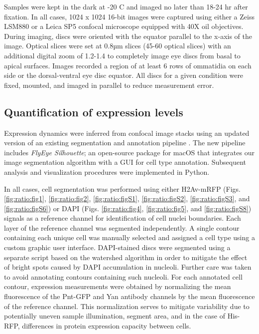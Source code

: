 Samples were kept in the dark at -20 \textdegree{}C and imaged no later than 18-24 hr after fixation. In all cases, 1024 x 1024 16-bit images were captured using either a Zeiss LSM880 or a Leica SP5 confocal microscope equipped with 40X oil objectives. During imaging, discs were oriented with the equator parallel to the x-axis of the image. Optical slices were set at 0.8µm slices (45-60 optical slices) with an additional digital zoom of 1.2-1.4 to completely image eye discs from basal to apical surfaces. Images recorded a region of at least 6 rows of ommatidia on each side or the dorsal-ventral eye disc equator. All discs for a given condition were fixed, mounted, and imaged in parallel to reduce measurement error.

\subsection{Quantification of expression levels}
\label{appendix:methods:ratio:quantification}

Expression dynamics were inferred from confocal image stacks using an updated version of an existing segmentation and annotation pipeline \cite{Pelaez2015a}. The new pipeline includes \textit{FlyEye Silhouette}; an open-source package for macOS that integrates our image segmentation algorithm with a GUI for cell type annotation. Subsequent analysis and visualization procedures were implemented in Python.

In all cases, cell segmentation was performed using either H2Av-mRFP (Figs. \ref{fig:ratio:fig1}, \ref{fig:ratio:fig2}, \ref{fig:ratio:figS1}, \ref{fig:ratio:figS2}, \ref{fig:ratio:figS3}, and \ref{fig:ratio:figS6}) or DAPI (Figs. \ref{fig:ratio:fig4}, \ref{fig:ratio:fig5}, and \ref{fig:ratio:figS8}) signals as a reference channel for identification of cell nuclei boundaries. Each layer of the reference channel was segmented independently. A single contour containing each unique cell was manually selected and assigned a cell type using a custom graphic user interface. DAPI-stained discs were segmented using a separate script based on the watershed algorithm in order to mitigate the effect of bright spots caused by DAPI accumulation in nucleoli. Further care was taken to avoid annotating contours containing such nucleoli. For each annotated cell contour, expression measurements were obtained by normalizing the mean fluorescence of the Pnt-GFP and Yan antibody channels by the mean fluorescence of the reference channel. This normalization serves to mitigate variability due to potentially uneven sample illumination, segment area, and in the case of His-RFP, differences in protein expression capacity between cells.

